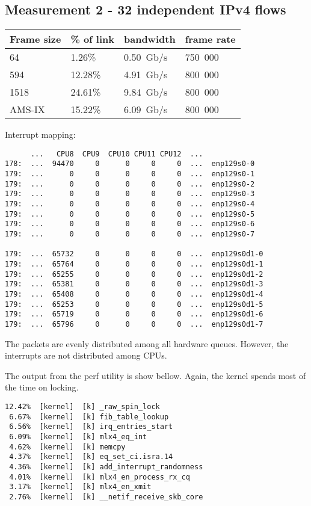 
\subsection{Measurement 2 - 32 independent IPv4 flows}
\begin{tabular}{ | l | l | l | l | }
\hline
Frame size & \% of link & bandwidth & frame rate \\
\hline
64     &  1.26\% &  0.50~Gb/s & 750~000 \\ %
594    & 12.28\% &  4.91~Gb/s & 800~000 \\ %
1518   & 24.61\% &  9.84~Gb/s & 800~000 \\ %
AMS-IX & 15.22\% &  6.09~Gb/s & 800~000 \\ %
\hline
\end{tabular}

Interrupt mapping:
\begin{lstlisting}
      ...   CPU8  CPU9  CPU10 CPU11 CPU12  ...
178:  ...  94470     0      0     0     0  ...  enp129s0-0
179:  ...      0     0      0     0     0  ...  enp129s0-1
179:  ...      0     0      0     0     0  ...  enp129s0-2
179:  ...      0     0      0     0     0  ...  enp129s0-3
179:  ...      0     0      0     0     0  ...  enp129s0-4
179:  ...      0     0      0     0     0  ...  enp129s0-5
179:  ...      0     0      0     0     0  ...  enp129s0-6
179:  ...      0     0      0     0     0  ...  enp129s0-7

179:  ...  65732     0      0     0     0  ...  enp129s0d1-0
179:  ...  65764     0      0     0     0  ...  enp129s0d1-1
179:  ...  65255     0      0     0     0  ...  enp129s0d1-2
179:  ...  65381     0      0     0     0  ...  enp129s0d1-3
179:  ...  65408     0      0     0     0  ...  enp129s0d1-4
179:  ...  65253     0      0     0     0  ...  enp129s0d1-5
179:  ...  65719     0      0     0     0  ...  enp129s0d1-6
179:  ...  65796     0      0     0     0  ...  enp129s0d1-7
\end{lstlisting}
The packets are evenly distributed among all hardware queues.
However, the interrupts are not distributed among CPUs.

The output from the perf utility is show bellow.
Again, the kernel spends most of the time on locking.
\begin{lstlisting}
12.42%  [kernel]  [k] _raw_spin_lock
 6.67%  [kernel]  [k] fib_table_lookup
 6.56%  [kernel]  [k] irq_entries_start
 6.09%  [kernel]  [k] mlx4_eq_int
 4.62%  [kernel]  [k] memcpy
 4.37%  [kernel]  [k] eq_set_ci.isra.14
 4.36%  [kernel]  [k] add_interrupt_randomness
 4.01%  [kernel]  [k] mlx4_en_process_rx_cq
 3.17%  [kernel]  [k] mlx4_en_xmit
 2.76%  [kernel]  [k] __netif_receive_skb_core
\end{lstlisting}



